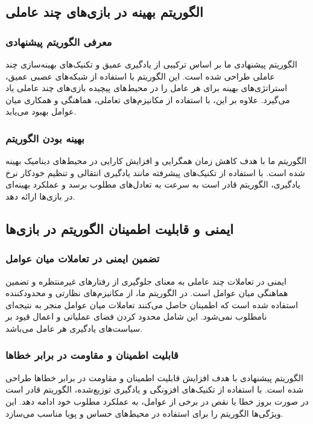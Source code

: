 \subsection{الگوریتم بهینه در بازی‌های چند عاملی}
\subsubsection{معرفی الگوریتم پیشنهادی}
الگوریتم پیشنهادی ما بر اساس ترکیبی از یادگیری عمیق و تکنیک‌های بهینه‌سازی چند عاملی طراحی شده است. این الگوریتم با استفاده از شبکه‌های عصبی عمیق، استراتژی‌های بهینه برای هر عامل را در محیط‌های پیچیده بازی‌های چند عاملی یاد می‌گیرد. علاوه بر این، با استفاده از مکانیزم‌های تعاملی، هماهنگی و همکاری میان عوامل بهبود می‌یابد.

\subsubsection{بهینه بودن الگوریتم}
الگوریتم ما با هدف کاهش زمان همگرایی و افزایش کارایی در محیط‌های دینامیک بهینه شده است. با استفاده از تکنیک‌های پیشرفته مانند یادگیری انتقالی و تنظیم خودکار نرخ یادگیری، الگوریتم قادر است به سرعت به تعادل‌های مطلوب برسد و عملکرد بهینه‌ای در بازی‌ها ارائه دهد.

\subsection{ایمنی و قابلیت اطمینان الگوریتم در بازی‌ها}
\subsubsection{تضمین ایمنی در تعاملات میان عوامل}
ایمنی در تعاملات چند عاملی به معنای جلوگیری از رفتارهای غیرمنتظره و تضمین هماهنگی میان عوامل است. در الگوریتم ما، از مکانیزم‌های نظارتی و محدودکننده استفاده شده است که اطمینان حاصل می‌کنند تعاملات میان عوامل منجر به نتیجه‌ای نامطلوب نمی‌شود. این شامل محدود کردن فضای عملیاتی و اعمال قیود بر سیاست‌های یادگیری هر عامل می‌باشد.

\subsubsection{قابلیت اطمینان و مقاومت در برابر خطاها}
الگوریتم پیشنهادی با هدف افزایش قابلیت اطمینان و مقاومت در برابر خطاها طراحی شده است. با استفاده از تکنیک‌های افزونگی و یادگیری توزیع‌شده، الگوریتم قادر است در صورت بروز خطا یا نقص در برخی از عوامل، به عملکرد مطلوب خود ادامه دهد. این ویژگی‌ها الگوریتم را برای استفاده در محیط‌های حساس و پویا مناسب می‌سازد.


